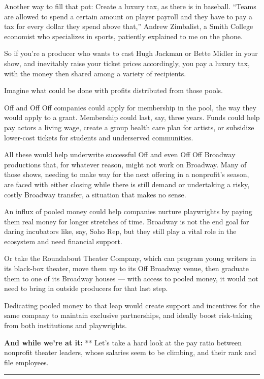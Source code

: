 Another way to fill that pot: Create a luxury tax, as there is in
baseball. ``Teams are allowed to spend a certain amount on player
payroll and they have to pay a tax for every dollar they spend above
that,'' Andrew Zimbalist, a Smith College economist who specializes in
sports, patiently explained to me on the phone.

So if you're a producer who wants to cast Hugh Jackman or Bette Midler
in your show, and inevitably raise your ticket prices accordingly, you
pay a luxury tax, with the money then shared among a variety of
recipients.

Imagine what could be done with profits distributed from those pools.

Off and Off Off companies could apply for membership in the pool, the
way they would apply to a grant. Membership could last, say, three
years. Funds could help pay actors a living wage, create a group health
care plan for artists, or subsidize lower-cost tickets for students and
underserved communities.

All these would help underwrite successful Off and even Off Off Broadway
productions that, for whatever reason, might not work on Broadway. Many
of those shows, needing to make way for the next offering in a
nonprofit's season, are faced with either closing while there is still
demand or undertaking a risky, costly Broadway transfer, a situation
that makes no sense.

An influx of pooled money could help companies nurture playwrights by
paying them real money for longer stretches of time. Broadway is not the
end goal for daring incubators like, say, Soho Rep, but they still play
a vital role in the ecosystem and need financial support.

Or take the Roundabout Theater Company, which can program young writers
in its black-box theater, move them up to its Off Broadway venue, then
graduate them to one of its Broadway houses --- with access to pooled
money, it would not need to bring in outside producers for that last
step.

Dedicating pooled money to that leap would create support and incentives
for the same company to maintain exclusive partnerships, and ideally
boost risk-taking from both institutions and playwrights.

\textbf{And while we're at it:} ** Let's take a hard look at the pay
ratio between nonprofit theater leaders, whose salaries seem to be
climbing, and their rank and file employees.

\begin{center}\rule{0.5\linewidth}{\linethickness}\end{center}

